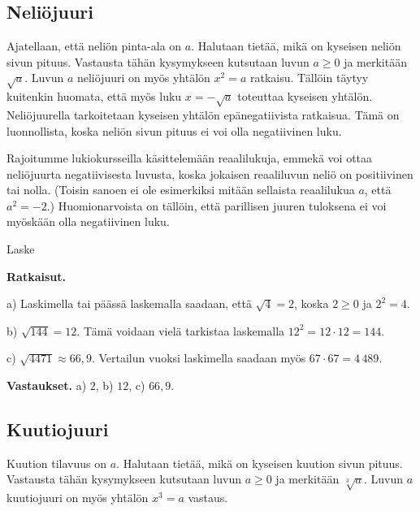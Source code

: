 \subsection*{Neliöjuuri}
\label{neliojuuri}

Ajatellaan, että neliön pinta-ala on $a$. Halutaan tietää, mikä on kyseisen neliön sivun pituus. Vastausta tähän kysymykseen kutsutaan luvun $a\ge 0$  ja merkitään $\sqrt{a}$. Luvun $a$ neliöjuuri on myös yhtälön $x^2 = a$ ratkaisu. Tällöin täytyy kuitenkin huomata, että myös luku $x=-\sqrt{a}$ toteuttaa kyseisen yhtälön. Neliöjuurella tarkoitetaan kyseisen yhtälön epänegatiivista ratkaisua. Tämä on luonnollista, koska neliön sivun pituus ei voi olla negatiivinen luku.


Rajoitumme lukiokursseilla käsittelemään reaalilukuja, emmekä voi ottaa neliöjuurta negatiivisesta luvusta, koska jokaisen reaaliluvun neliö on positiivinen tai nolla. (Toisin sanoen ei ole esimerkiksi mitään sellaista reaalilukua $a$, että $a^2=-2$.) Huomionarvoista on tällöin, että parillisen juuren tuloksena ei voi myöskään olla negatiivinen luku.

\begin{esimerkki}
Laske

{\bf Ratkaisut.}

a)
Laskimella tai päässä laskemalla saadaan, että $\sqrt{4} = 2$, koska $2\geq0$ ja $2^2 =4$.

b) 
$\sqrt{144}=12$. Tämä voidaan vielä tarkistaa laskemalla $12^2 = 12\cdot 12=144$.

c)
$\sqrt{4471}\approx 66,9$. Vertailun vuoksi laskimella saadaan myös $67\cdot 67=4\,489$.

{\bf Vastaukset.}
a) $2$, b) $12$, c) $66,9$.

\end{esimerkki}


\subsection*{Kuutiojuuri}

Kuution tilavuus on $a$. Halutaan tietää, mikä on kyseisen kuution sivun pituus. Vastausta tähän kysymykseen kutsutaan luvun $a\ge 0$  ja merkitään $\sqrt[3]{a}$. Luvun $a$ kuutiojuuri on myös yhtälön $x^3 = a$ vastaus.

